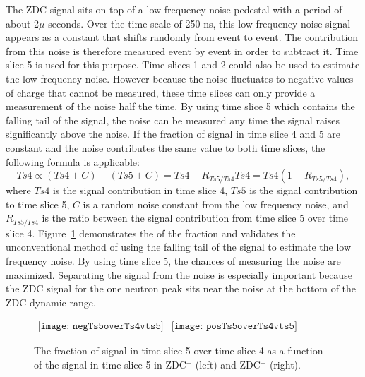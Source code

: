       The ZDC signal sits on top of a low frequency noise pedestal with a 
        period of about 2$\mu$ seconds. 
      Over the time scale of 250 ns, this low frequency noise signal appears
        as a constant that shifts randomly from event to event.
      The contribution from this noise is therefore measured event by event
        in order to subtract it.
      Time slice 5 is used for this purpose.
      Time slices 1 and 2 could also be used to estimate the low frequency 
        noise.
      However because the noise fluctuates to negative values of charge that 
        cannot be measured, these time slices can only provide a 
        measurement of the noise half the time. 
      By using time slice 5 which contains the falling tail of the signal, 
        the noise can be measured any time the signal raises significantly 
        above the noise.
      If the fraction of signal in time slice 4 and 5 are constant and
        the noise contributes the same value to both time slices, the 
        following formula is applicable:
      \begin{equation}
        Ts4 \propto (Ts4 + C) - ( Ts5 + C ) = Ts4 - R_{Ts5/Ts4}Ts4 
        = Ts4(1-R_{Ts5/Ts4}),
        \label{eq:ts4ish}
      \end{equation}
      where $Ts4$ is the signal contribution in time slice 4, $Ts5$ is the 
        signal contribution to time slice 5, $C$ is a random noise constant
        from the low frequency noise, and $R_{Ts5/Ts4}$ is the ratio between
        the signal contribution from time slice 5 over time slice 4.
      Figure~\ref{fig:zdcTs4OvTs5VTs5} demonstrates the \DIFdelbegin {}\DIFdelend \DIFaddbegin {}\DIFaddend of the 
        fraction and validates the unconventional method of using the falling 
        tail of the signal to estimate the low frequency noise. 
      By using time slice 5, the chances of measuring the noise are maximized. 
      Separating the signal from the noise is especially important because
        the ZDC signal for the one neutron peak sits near the noise at the 
        bottom of the ZDC dynamic range.
      \begin{figure}[!Hhbt]
        \centering
        $ \begin{array}{cc}
          \texttt{[image: negTs5overTs4vts5]} &
          \texttt{[image: posTs5overTs4vts5]}
        \end{array} $  
        \caption{ The fraction of signal in time slice 5 over time slice 4 
          as a function of the signal in time slice 5 in ZDC$^{-}$ (left) and 
          ZDC$^{+}$ (right).}
        \label{fig:zdcTs4OvTs5VTs5}
      \end{figure}

